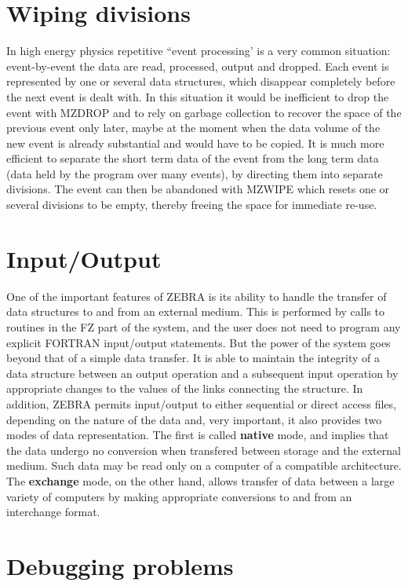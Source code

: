 \section{Wiping divisions}
\par In high energy physics repetitive ``event processing'
is a very common
situation: event-by-event the data are read, processed, output and
dropped. Each event is represented by one or several data structures,
which disappear completely before the next event is dealt with.
In this situation it would be inefficient to drop the event with MZDROP
and to rely on garbage collection to recover the space of the previous
event only later, maybe at the moment when the data volume of the new
event is already substantial and would have to be copied. It is much
more efficient to separate the short term data of the event from the
long term data (data held by the program over many events), by
directing them into separate divisions. The event can then be
abandoned with MZWIPE which resets one or several divisions to be empty,
thereby freeing the space for immediate re-use.
\section{Input/Output}
\par One of the important features of ZEBRA is its ability to handle the
transfer of data structures to and from an external
medium. This is performed by calls to routines in the FZ part of the
system, and the user does not need to program any explicit FORTRAN input/output
statements. But the power of the system goes beyond that of a simple data
transfer. It is able to maintain the integrity of a data structure
between an output operation and a subsequent input operation by
appropriate changes to the values of the links connecting the
structure. In addition, ZEBRA permits
input/output to either sequential or direct access files, depending on the
nature
of the data and, very important, it also provides two modes of data
representation. The first is called
{\bf native} mode, and implies that the data undergo no conversion when
transfered between storage and the external medium. Such data may be read
only on a computer of a compatible architecture. The
{\bf exchange} mode, on the other hand,
allows transfer of data between a large variety of
computers by making appropriate conversions to and from an interchange
format.
\section{Debugging problems}
